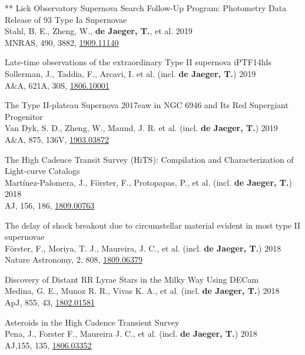 \documentclass[12pt]{article}
\begin{document}
\begin{bibenum}
    \item 
** Lick Observatory Supernova Search Follow-Up Program: Photometry Data Release of 93 Type Ia Supernovae\\
Stahl, B. E., Zheng, W., \textbf{de Jaeger, T.}, et al. 2019\\
MNRAS, 490, 3882, \href{https://arxiv.org/abs/1909.11140}{1909.11140}
    \item 
Late-time observations of the extraordinary Type II supernova iPTF14hls\\
Sollerman, J., Taddia, F., Arcavi, I. et al. (incl. \textbf{de Jaeger, T.}) 2019\\
A\&A, 621A, 30S, \href{https://arxiv.org/abs/1806.10001}{1806.10001}
    \item 
The Type II-plateau Supernova 2017eaw in NGC 6946 and Its Red Supergiant Progenitor\\
Van Dyk, S. D., Zheng, W., Maund, J. R. et al. (incl. \textbf{de Jaeger, T.}) 2019\\
A\&A, 875, 136V, \href{https://arxiv.org/abs/1903.03872}{1903.03872}
    \item 
The High Cadence Transit Survey (HiTS): Compilation and Characterization of Light-curve Catalogs\\
Mart\'inez-Palomera, J., F\"orster, F., Protopapas, P., et al. (incl. \textbf{de Jaeger, T.}) 2018\\
AJ, 156, 186, \href{https://arxiv.org/abs/1809.00763}{1809.00763}
    \item 
The delay of shock breakout due to circumstellar material evident in most type II supernovae\\
F\"orster, F., Moriya, T. J., Maureira, J. C., et al. (incl. \textbf{de Jaeger, T.}) 2018\\
Nature Astronomy, 2, 808, \href{https://arxiv.org/abs/1809.06379}{1809.06379}
    \item 
Discovery of Distant RR Lyrae Stars in the Milky Way Using DECam\\
Medina, G. E., Munoz R. R., Vivas K. A., et al. (incl. \textbf{de Jaeger, T.}) 2018\\
ApJ, 855, 43, \href{https://arxiv.org/abs/1802.01581}{1802.01581}
    \item 
Asteroids in the High Cadence Transient Survey\\
Pena, J., Forster F., Maureira J. C., et al. (incl. \textbf{de Jaeger, T.}) 2018\\
AJ,155, 135, \href{https://arxiv.org/abs/1806.03352}{1806.03352}
    \item 	

\end{bibenum}
\end{document}
